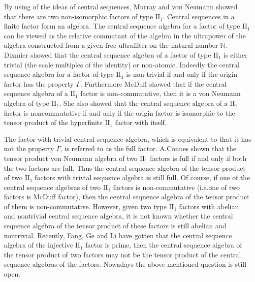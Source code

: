 \documentclass[12pt]{article}
\begin{document}
By using of the ideas of central sequences, Murray and von Neumann
showed that there are two non-isomorphic factors of type
$\mathrm{II}_{1}$. Central sequences in a finite factor form an
algebra. The central sequence algebra for a factor of type
$\mathrm{II}_{1}$ can be viewed as the relative commutant of the
algebra in the ultrapower of the algebra constructed from a given
free ultrafilter on the natural number $\mathbb{N}$. Dixmier
{\cite{[Dix]}} showed that the central sequence algebra of a factor
of type $\mathrm{II}_{1}$ is either trivial (the scale multiples of
the identity) or non-atomic. Indeedly the central sequence algebra
for a factor of type $\mathrm{II}_{1}$ is non-trivial if and only if
the origin factor has the property $\Gamma$. Furthermore McDuff
{\cite{[MD]}} showed that if the central sequence algebra of a
$\mathrm{II}_{1}$ factor is non-commutative, then it is a von
Neumann algebra of type $\mathrm{II}_{1}$. She also showed that the
central sequence algebra of a $\mathrm{II}_{1}$ factor is
noncommutative if and only if the origin factor is isomorphic to the
tensor product of the hyperfinite $\mathrm{II}_{1}$ factor with
itself.

The factor with trivial central sequence algebra, which is
equivalent to that it has not the property $\Gamma$, is referred to
as the full factor. A.Connes {\cite{[Co]}} shown that the tensor
product von Neumann algebra of two $\mathrm{II}_{1}$ factors is full
if and only if both the two factors are full. Thus the central
sequence algebra of the tensor product of two $\mathrm{II}_{1}$
factors with trivial sequence algebra is still full. Of course, if
one of the central sequence algebras of two $\mathrm{II}_{1}$
factors is non-commutative (i.e.one of two factors is McDuff
factor), then the central sequence algebra of the tensor product of
them is non-commutative. However, given two type $\mathrm{II}_{1}$
factors with abelian and nontrivial central sequence algebra, it is
not known whether the central sequence algebra of the tensor product
of these factors is still abelian and nontrivial. Recently, Fang, Ge
and Li {\cite{[FGL]}} have gotten that the central sequence algebra
of the injective $\mathrm{II}_{1}$ factor is prime, then the central
sequence algebra of the tensor product of two factors may not be the
tensor product of the central sequence algebras of the factors.
Nowadays the above-mentioned question is still open.
\end{document}
